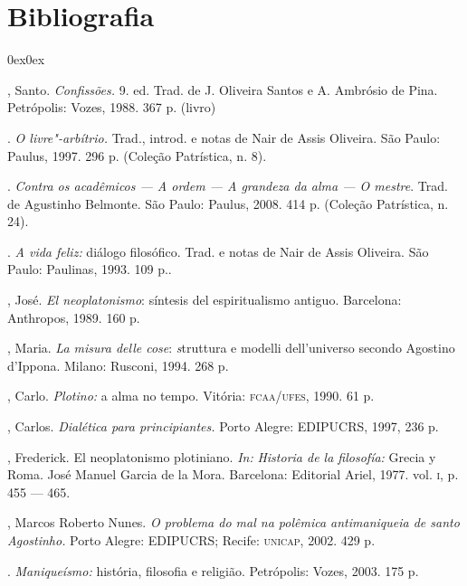 \section{Bibliografia}


\begin{description}0ex\parsep0ex
\newcommand{\tit}[1]{\item[\textnormal{\textsc{\MakeTextLowercase{#1}}}]}
\newcommand{\titidem}{\item[\line(1,0){25}]}

\tit{agostinho}, Santo. \emph{Confissões.} 9. ed. Trad. de J.
Oliveira Santos e A. Ambrósio de Pina.  Petrópolis: Vozes, 1988.
367 p. (livro)

 \titidem. \emph{O
livre"-arbítrio}\emph{.} Trad.,  introd. e notas de Nair de
Assis Oliveira. São Paulo: Paulus, 1997. 296 p. (Coleção
Patrística, n. 8).

 \titidem. \emph{Contra os
acadêmicos --- A ordem --- A grandeza da alma --- O mestre}. Trad. de
Agustinho Belmonte. São Paulo: Paulus, 2008. 414 p.
(Coleção Patrística, n. 24).

 \titidem.  \emph{A vida
feliz}\emph{:} diálogo filosófico. Trad. e notas de Nair de
Assis Oliveira. São Paulo: Paulinas, 1993. 109 p..

 \tit{alsina clota}, José. \emph{El neoplatonismo}: síntesis del
espiritualismo antiguo. Barcelona: Anthropos, 1989. 160 p.


\tit{bettetini}, Maria. \emph{La misura delle cose}:\emph{
s}truttura e modelli dell'universo secondo Agostino d'Ippona.
Milano: Rusconi, 1994. 268 p.

 \tit{bussola}, Carlo.
\emph{Plotino}\emph{:} a alma no tempo. Vitória:
\textsc{fcaa}/\textsc{ufes},
1990. 61  p.

 \tit{cirne"-lima}, Carlos.  \emph{Dialética para
principiantes}\emph{.} Porto Alegre: \MakeUppercase{Edipucrs},
1997, 236 p.

 \tit{copleston}, Frederick. El neoplatonismo
plotiniano. \emph{In:} \emph{Historia de la
filosofía}\emph{:} Grecia y Roma. José Manuel Garcia de la
Mora. Barcelona: Editorial Ariel, 1977. vol. \textsc{i}, p. 455 ---
465.

 \tit{costa}, Marcos Roberto Nunes. \emph{O problema do mal
na polêmica antimaniqueia de santo Agostinho}\emph{.} Porto
Alegre: \MakeUppercase{Edipucrs}; Recife: \textsc{unicap}, 2002. 429 p.


 \titidem. \emph{Maniqueísmo:} história,
filosofia e religião. Petrópolis: Vozes, 2003. 175 p.


\end{description}
